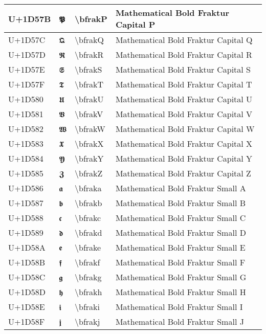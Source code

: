 \begin{table}[h]
\begin{tabulary}{\linewidth}{|L|L|L|L|}
\hline
U+1D57B & 𝕻 & {\textbackslash}bfrakP & Mathematical Bold Fraktur Capital P \\
\hline
U+1D57C & 𝕼 & {\textbackslash}bfrakQ & Mathematical Bold Fraktur Capital Q \\
\hline
U+1D57D & 𝕽 & {\textbackslash}bfrakR & Mathematical Bold Fraktur Capital R \\
\hline
U+1D57E & 𝕾 & {\textbackslash}bfrakS & Mathematical Bold Fraktur Capital S \\
\hline
U+1D57F & 𝕿 & {\textbackslash}bfrakT & Mathematical Bold Fraktur Capital T \\
\hline
U+1D580 & 𝖀 & {\textbackslash}bfrakU & Mathematical Bold Fraktur Capital U \\
\hline
U+1D581 & 𝖁 & {\textbackslash}bfrakV & Mathematical Bold Fraktur Capital V \\
\hline
U+1D582 & 𝖂 & {\textbackslash}bfrakW & Mathematical Bold Fraktur Capital W \\
\hline
U+1D583 & 𝖃 & {\textbackslash}bfrakX & Mathematical Bold Fraktur Capital X \\
\hline
U+1D584 & 𝖄 & {\textbackslash}bfrakY & Mathematical Bold Fraktur Capital Y \\
\hline
U+1D585 & 𝖅 & {\textbackslash}bfrakZ & Mathematical Bold Fraktur Capital Z \\
\hline
U+1D586 & 𝖆 & {\textbackslash}bfraka & Mathematical Bold Fraktur Small A \\
\hline
U+1D587 & 𝖇 & {\textbackslash}bfrakb & Mathematical Bold Fraktur Small B \\
\hline
U+1D588 & 𝖈 & {\textbackslash}bfrakc & Mathematical Bold Fraktur Small C \\
\hline
U+1D589 & 𝖉 & {\textbackslash}bfrakd & Mathematical Bold Fraktur Small D \\
\hline
U+1D58A & 𝖊 & {\textbackslash}bfrake & Mathematical Bold Fraktur Small E \\
\hline
U+1D58B & 𝖋 & {\textbackslash}bfrakf & Mathematical Bold Fraktur Small F \\
\hline
U+1D58C & 𝖌 & {\textbackslash}bfrakg & Mathematical Bold Fraktur Small G \\
\hline
U+1D58D & 𝖍 & {\textbackslash}bfrakh & Mathematical Bold Fraktur Small H \\
\hline
U+1D58E & 𝖎 & {\textbackslash}bfraki & Mathematical Bold Fraktur Small I \\
\hline
U+1D58F & 𝖏 & {\textbackslash}bfrakj & Mathematical Bold Fraktur Small J \\

\end{tabulary}
\end{table}
